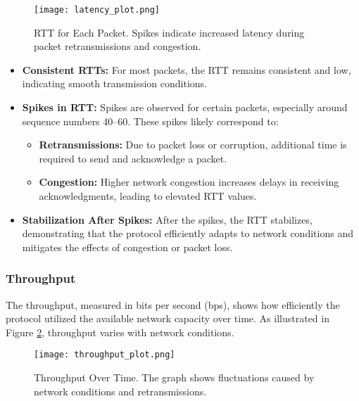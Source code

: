 \documentclass[11pt]{article}
\begin{document}
\begin{figure}[H]
    \centering
    \texttt{[image: latency\_plot.png]}
    \caption{RTT for Each Packet. Spikes indicate increased latency during packet retransmissions and congestion.}
    \label{fig:latency_plot}
\end{figure}

\begin{itemize}
    \item \textbf{Consistent RTTs:} For most packets, the RTT remains consistent and low, indicating smooth transmission conditions.
    \item \textbf{Spikes in RTT:} Spikes are observed for certain packets, especially around sequence numbers 40–60. These spikes likely correspond to:
    \begin{itemize}
        \item \textbf{Retransmissions:} Due to packet loss or corruption, additional time is required to send and acknowledge a packet.
        \item \textbf{Congestion:} Higher network congestion increases delays in receiving acknowledgments, leading to elevated RTT values.
    \end{itemize}
    \item \textbf{Stabilization After Spikes:} After the spikes, the RTT stabilizes, demonstrating that the protocol efficiently adapts to network conditions and mitigates the effects of congestion or packet loss.
\end{itemize}

\subsubsection{Throughput}

The throughput, measured in bits per second (bps), shows how efficiently the protocol utilized the available network capacity over time. As illustrated in Figure \ref{fig:throughput_plot}, throughput varies with network conditions.

\begin{figure}[H]
    \centering
    \texttt{[image: throughput\_plot.png]}
    \caption{Throughput Over Time. The graph shows fluctuations caused by network conditions and retransmissions.}
    \label{fig:throughput_plot}
\end{figure}
\end{document}
